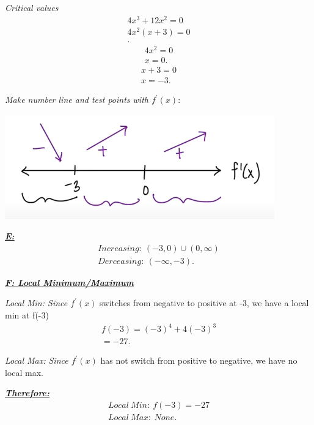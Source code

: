 \documentclass{report}
\begin{document}
  \bigbreak \noindent 
  \textit{Critical values}
  \begin{align*}
    4x^{3} + 12x^{2} = 0 \\ 
    4x^{2}(x + 3) = 0 \\
  .\end{align*}
  \begin{align*}
    4x^{2} = 0 \\
    \boxed{x = 0}
  .\end{align*}
  \begin{align*}
    x+ 3 = 0  \\
    \boxed{x = -3}
  .\end{align*}
  
  \bigbreak \noindent 
  \textit{Make number line and test points with $f^{\prime}(x)$}:

  \bigbreak \noindent 
  \begin{center}
    \includegraphics[scale=0.7]{ ./images/14.png}
  \end{center}

  \bigbreak \noindent 
  \textbf{\textit{\underline{E:}}}
  \begin{align*}
    Increasing:\ (-3,0) \cup (0,\infty)\\
    Derceasing:\ (-\infty, -3)
  .\end{align*}

  \pagebreak \bigbreak \noindent
  \textbf{\textit{\underline{F: Local Minimum/Maximum}}}

  \bigbreak \noindent 
  \textit{Local Min: Since $f^{\prime}(x)$} switches from negative to positive at -3, we have a local min at f(-3)
  \begin{align*}
    f(-3) = (-3)^{4} + 4(-3)^{3} \\
    \boxed{=-27}
  .\end{align*}

  \bigbreak \noindent 
  \textit{Local Max: Since $f^{\prime}(x)$} has not switch from positive to negative, we have no local max.

  \bigbreak \noindent 
  \textbf{\textit{\underline{Therefore:}}}
  \begin{align*}
    Local\ Min:\ f(-3) = -27 \\
    Local\ Max:\ None
  .\end{align*}
\end{document}
